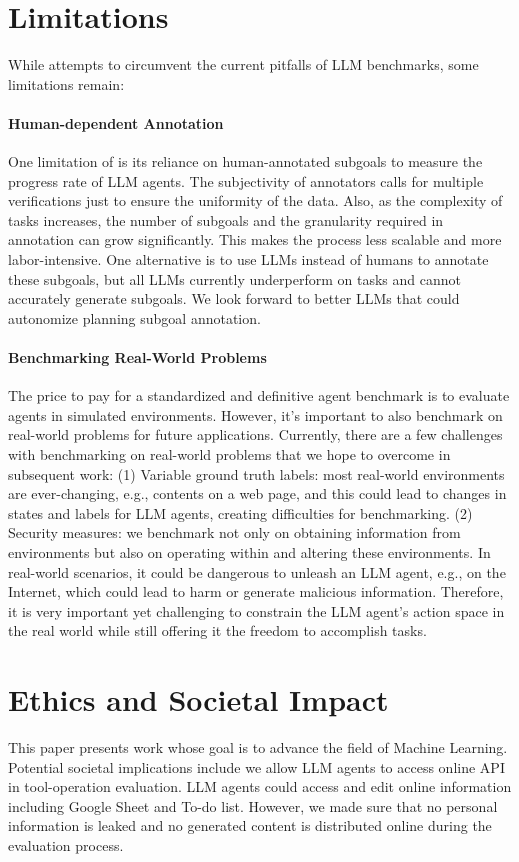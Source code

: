 \section{Limitations\label{appendix: limitation}}
While \BenchName{} attempts to circumvent the current pitfalls of LLM benchmarks, some limitations remain:

\paragraph{Human-dependent Annotation} One limitation of \BenchName{} is its reliance on human-annotated subgoals to measure the progress rate of LLM agents. The subjectivity of annotators calls for multiple verifications just to ensure the uniformity of the data. Also, as the complexity of tasks increases, the number of subgoals and the granularity required in annotation can grow significantly. This makes the process less scalable and more labor-intensive. One alternative is to use LLMs instead of humans to annotate these subgoals, but all LLMs currently underperform on \BenchName{} tasks and cannot accurately generate subgoals. We look forward to better LLMs that could autonomize planning subgoal annotation.

\paragraph{Benchmarking Real-World Problems} The price to pay for a standardized and definitive agent benchmark is to evaluate agents in simulated environments. However, it's important to also benchmark on real-world problems for future applications. Currently, there are a few challenges with benchmarking on real-world problems that we hope to overcome in subsequent work: (1) Variable ground truth labels: most real-world environments are ever-changing, e.g., contents on a web page, and this could lead to changes in states and labels for LLM agents, creating difficulties for benchmarking. (2) Security measures: we benchmark not only on obtaining information from environments but also on operating within and altering these environments. In real-world scenarios, it could be dangerous to unleash an LLM agent, e.g., on the Internet, which could lead to harm or generate malicious information. Therefore, it is very important yet challenging to constrain the LLM agent's action space in the real world while still offering it the freedom to accomplish tasks.




\section{Ethics and Societal Impact\label{appendix: ethics}}
This paper presents work whose goal is to advance the field of Machine Learning. Potential societal implications include we allow LLM agents to access online API in tool-operation evaluation. LLM agents could access and edit online information including Google Sheet and To-do list. However, we made sure that no personal information is leaked and no generated content is distributed online during the evaluation process.